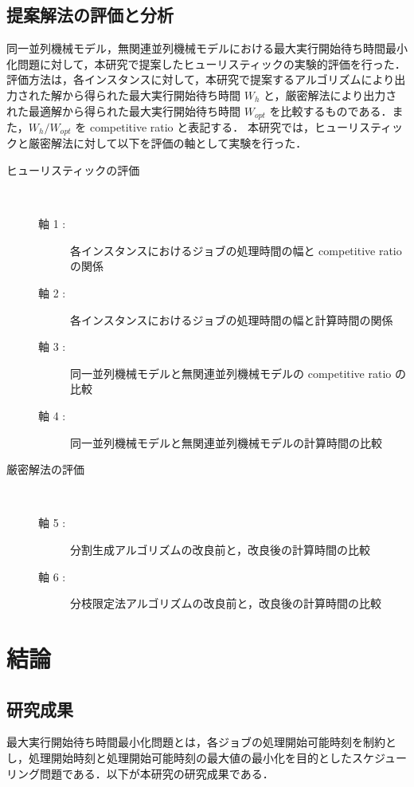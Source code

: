 \documentclass[12pt]{optlab-bachelor}
\begin{document}
\section{提案解法の評価と分析}\label{5_s_3}
同一並列機械モデル，無関連並列機械モデルにおける最大実行開始待ち時間最小化問題に対して，本研究で提案したヒューリスティックの実験的評価を行った．評価方法は，各インスタンスに対して，本研究で提案するアルゴリズムにより出力された解から得られた最大実行開始待ち時間 $W_h$ と，厳密解法により出力された最適解から得られた最大実行開始待ち時間 $W_{opt}$ を比較するものである．また，$W_h/W_{opt}$ を competitive ratio と表記する．
本研究では，ヒューリスティックと厳密解法に対して以下を評価の軸として実験を行った．
\begin{description}
  \item[ヒューリスティックの評価] ~
  \begin{description}
    \item[軸 1 :] 各インスタンスにおけるジョブの処理時間の幅と competitive ratio の関係
    \item[軸 2 :] 各インスタンスにおけるジョブの処理時間の幅と計算時間の関係
    \item[軸 3 :] 同一並列機械モデルと無関連並列機械モデルの competitive ratio の比較
    \item[軸 4 :] 同一並列機械モデルと無関連並列機械モデルの計算時間の比較
  \end{description}
  \item[厳密解法の評価] ~
  \begin{description}
    \item[軸 5 :] 分割生成アルゴリズムの改良前と，改良後の計算時間の比較
    \item[軸 6 :] 分枝限定法アルゴリズムの改良前と，改良後の計算時間の比較
  \end{description}
\end{description}

\chapter{結論}\label{c_6}
\section{研究成果}
最大実行開始待ち時間最小化問題とは，各ジョブの処理開始可能時刻を制約とし，処理開始時刻と処理開始可能時刻の最大値の最小化を目的としたスケジューリング問題である．以下が本研究の研究成果である．
\end{document}
